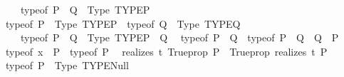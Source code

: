 \begin{isabellebody}
\ \ \ \ \ typeof\ {\isacharparenleft}{\kern0pt}P\ {\isasymand}\ Q{\isacharparenright}{\kern0pt}\ {\isasymequiv}\ Type\ {\isacharparenleft}{\kern0pt}TYPE{\isacharparenleft}{\kern0pt}{\isacharprime}{\kern0pt}P{\isacharparenright}{\kern0pt}{\isacharparenright}{\kern0pt}{\isachardoublequoteclose}\isanewline
\isanewline
\ \ {\isachardoublequoteopen}typeof\ P\ {\isasymequiv}\ Type\ {\isacharparenleft}{\kern0pt}TYPE{\isacharparenleft}{\kern0pt}{\isacharprime}{\kern0pt}P{\isacharparenright}{\kern0pt}{\isacharparenright}{\kern0pt}\ {\isasymLongrightarrow}\ typeof\ Q\ {\isasymequiv}\ Type\ {\isacharparenleft}{\kern0pt}TYPE{\isacharparenleft}{\kern0pt}{\isacharprime}{\kern0pt}Q{\isacharparenright}{\kern0pt}{\isacharparenright}{\kern0pt}\ {\isasymLongrightarrow}\isanewline
\ \ \ \ \ typeof\ {\isacharparenleft}{\kern0pt}P\ {\isasymand}\ Q{\isacharparenright}{\kern0pt}\ {\isasymequiv}\ Type\ {\isacharparenleft}{\kern0pt}TYPE{\isacharparenleft}{\kern0pt}{\isacharprime}{\kern0pt}P\ {\isasymtimes}\ {\isacharprime}{\kern0pt}Q{\isacharparenright}{\kern0pt}{\isacharparenright}{\kern0pt}{\isachardoublequoteclose}\isanewline
\isanewline
\ \ {\isachardoublequoteopen}typeof\ {\isacharparenleft}{\kern0pt}P\ {\isacharequal}{\kern0pt}\ Q{\isacharparenright}{\kern0pt}\ {\isasymequiv}\ typeof\ {\isacharparenleft}{\kern0pt}{\isacharparenleft}{\kern0pt}P\ {\isasymlongrightarrow}\ Q{\isacharparenright}{\kern0pt}\ {\isasymand}\ {\isacharparenleft}{\kern0pt}Q\ {\isasymlongrightarrow}\ P{\isacharparenright}{\kern0pt}{\isacharparenright}{\kern0pt}{\isachardoublequoteclose}\isanewline
\isanewline
\ \ {\isachardoublequoteopen}typeof\ {\isacharparenleft}{\kern0pt}x\ {\isasymin}\ P{\isacharparenright}{\kern0pt}\ {\isasymequiv}\ typeof\ P{\isachardoublequoteclose}%
\isadelimdocument
%
\endisadelimdocument
%
\isatagdocument
%
\isamarkuptrue%
%
\endisatagdocument
{\isafolddocument}%
%
\isadelimdocument
%
\endisadelimdocument
{}\isamarkupfalse%
\isanewline
\ \ {\isachardoublequoteopen}{\isacharparenleft}{\kern0pt}realizes\ t\ {\isacharparenleft}{\kern0pt}Trueprop\ P{\isacharparenright}{\kern0pt}{\isacharparenright}{\kern0pt}\ {\isasymequiv}\ {\isacharparenleft}{\kern0pt}Trueprop\ {\isacharparenleft}{\kern0pt}realizes\ t\ P{\isacharparenright}{\kern0pt}{\isacharparenright}{\kern0pt}{\isachardoublequoteclose}\isanewline
\isanewline
\ \ {\isachardoublequoteopen}{\isacharparenleft}{\kern0pt}typeof\ P{\isacharparenright}{\kern0pt}\ {\isasymequiv}\ {\isacharparenleft}{\kern0pt}Type\ {\isacharparenleft}{\kern0pt}TYPE{\isacharparenleft}{\kern0pt}Null{\isacharparenright}{\kern0pt}{\isacharparenright}{\kern0pt}{\isacharparenright}{\kern0pt}\ {\isasymLongrightarrow}\isanewline

\end{isabellebody}
